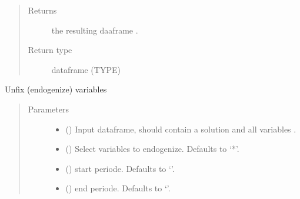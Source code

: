 \documentclass[letterpaper,10pt,english]{sphinxmanual}
\begin{document}
\begin{fulllineitems}
\begin{fulllineitems}
\begin{quote}
\begin{description}
\item[{Returns}] \leavevmode
\sphinxAtStartPar
the resulting daaframe .

\item[{Return type}] \leavevmode
\sphinxAtStartPar
dataframe (TYPE)

\end{description}\end{quote}

\end{fulllineitems}


\begin{fulllineitems}
\label{\detokenize{index:modelclass.WB_Mixin.unfix}}
\pysigstartsignatures
{}
\pysigstopsignatures
\sphinxAtStartPar
Unfix (endogenize) variables
\begin{quote}\begin{description}
\item[{Parameters}] \leavevmode\begin{itemize}
\item {} 
\sphinxAtStartPar
{} () \textendash{} Input dataframe, should contain a solution and all variables .

\item {} 
\sphinxAtStartPar
{} (\sphinxstyleliteralemphasis{\sphinxupquote{, }}) \textendash{} Select variables to endogenize. Defaults to ‘*’.

\item {} 
\sphinxAtStartPar
{} (\sphinxstyleliteralemphasis{\sphinxupquote{, }}) \textendash{} start periode. Defaults to ‘’.

\item {} 
\sphinxAtStartPar
{} (\sphinxstyleliteralemphasis{\sphinxupquote{, }}) \textendash{} end periode. Defaults to ‘’.


\end{itemize}
\end{description}
\end{quote}
\end{fulllineitems}
\end{fulllineitems}
\end{document}
